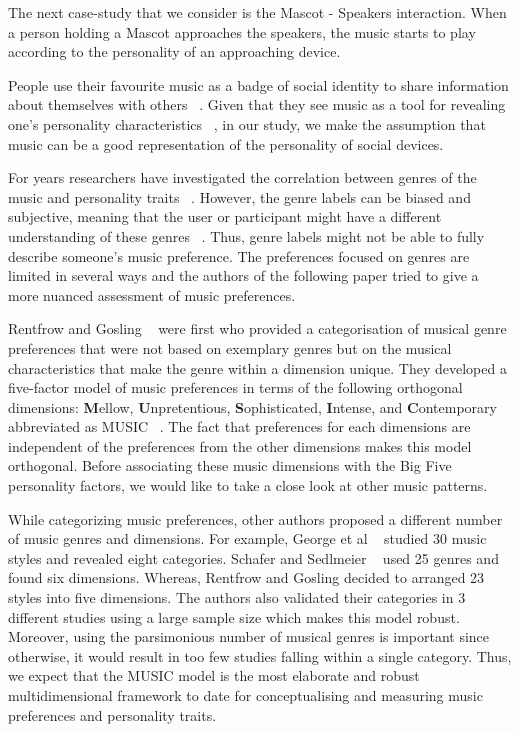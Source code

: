 The next case-study that we consider is the Mascot - Speakers interaction.
When a person holding a Mascot approaches the speakers,
the music starts to play according to the personality of an approaching device.

People use their favourite music as a badge of social identity to share
information about themselves with others ~\cite{boer2011shared,rentfrow2007content}.
Given that they see music as a tool for revealing one’s personality characteristics ~\cite{rentfrow2006message},
in our study, we make the assumption that music can be a good representation of the personality of social devices.

For years researchers have investigated the correlation between genres of the music and personality
traits ~\cite{schafer2009functions,george2007association,zweigenhaft2008re,dunn2012toward}.
However, the genre labels can be biased and subjective, meaning that the user or
participant might have a different understanding of these genres ~\cite{rentfrow2011structure}.
Thus, genre labels might not be able to fully describe someone’s music preference.
The preferences focused on genres are limited in several ways and the authors of the
following paper tried to give a more nuanced assessment of music preferences.

Rentfrow and Gosling ~\cite{rentfrow2003re} were first who provided a categorisation
of musical genre preferences that were not based on exemplary genres but on the musical
characteristics that make the genre within a dimension unique.
They developed a five-factor model of music preferences in terms of the
following orthogonal dimensions: \textbf{M}ellow, \textbf{U}npretentious, \textbf{S}ophisticated,
\textbf{I}ntense, and \textbf{C}ontemporary abbreviated as MUSIC ~\cite{rentfrow2011structure}.
The fact that preferences for each dimensions are independent of the preferences
from the other dimensions makes this model orthogonal.
Before associating these music dimensions with the Big Five personality factors,
we would like to take a close look at other music patterns.

While categorizing music preferences, other authors proposed a different number of music genres and dimensions.
For example, George et al ~\cite{george2007association} studied 30 music styles and revealed eight categories.
Schafer and Sedlmeier ~\cite{schafer2009functions} used 25 genres and found six dimensions.
Whereas, Rentfrow and Gosling decided to arranged 23 styles into five dimensions.
The authors also validated their categories in 3 different studies
using a large sample size which makes this model robust.
Moreover, using the parsimonious number of musical genres is important since otherwise,
it would result in too few studies falling within a single category.
Thus, we expect that the MUSIC model is the most elaborate and robust
multidimensional framework to date for conceptualising and measuring music preferences and personality traits.

